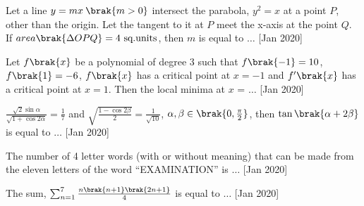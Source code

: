\iffalse
    \title{2020}
    \author{AI24BTECH11030}
    \section{integer}
\fi


    \item Let a line $y = mx \: \brak{m > 0}$ intersect the parabola, $y^2 = x$ at a point $P$, other than the origin. Let the tangent to it at $P$ meet the x-axis at the point $Q$. If $area\brak{\Delta OPQ} = 4 \text{ sq.units}$, then $m$ is equal to $\ldots$ \hfill [Jan 2020]\\
    
    \item Let $f\brak{x}$ be a polynomial of degree 3 such that $f\brak{-1} = 10$, $f\brak{1} = -6$, $f\brak{x}$ has a critical point at $x = -1$ and $f^\prime\brak{x}$ has a critical point at $x = 1$. Then the local minima at $x$ = $\ldots$ \hfill [Jan 2020]\\
    
    \item $\frac{\sqrt{2}\sin\alpha}{\sqrt{1 + \cos2\alpha}} = \frac{1}{7}$ and $\sqrt{\frac{1-\cos2\beta}{2}} = \frac{1}{\sqrt{10}}$, $\alpha, \beta \in \brak{0, \frac{\pi}{2}}$, then $\tan\brak{\alpha + 2\beta}$ is equal to $\ldots$ \hfill [Jan 2020]\\
    
    \item The number of 4 letter words (with or without meaning) that can be made from the eleven letters of the word ``EXAMINATION'' is $\ldots$ \hfill [Jan 2020]\\
    
    \item The sum, $\sum_{n=1}^{7}\frac{n\brak{n+1}\brak{2n+1}}{4}$ is equal to $\ldots$ \hfill [Jan 2020]\\
